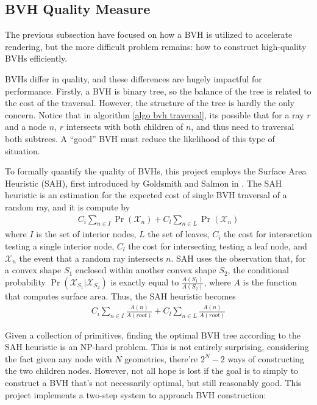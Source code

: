 \subsection{BVH Quality Measure}
The previous subsection have focused on how a BVH is utilized to accelerate rendering, but the more difficult problem remains: how to construct high-quality BVHs efficiently. 

BVHs differ in quality, and these differences are hugely impactful for performance. Firstly, a BVH is binary tree, so the balance of the tree is related to the cost of the traversal. However, the structure of the tree is hardly the only concern. Notice that in algorithm \ref{algo bvh traversal}, its possible that for a ray $r$ and a node $n$, $r$ intersects with both children of $n$, and thus need to traversal both subtrees. A ``good'' BVH must reduce the likelihood of this type of situation. 

To formally quantify the quality of BVHs, this project employs the Surface Area Heuristic (SAH), first introduced by Goldsmith and Salmon in \cite{goldsmith1987automatic}. The SAH heuristic is an estimation for the expected cost of single BVH traversal of a random ray, and it is compute by
\begin{align*}
    C_i \sum_{n\in I} \Pr(\mathcal{X}_n) + C_l \sum_{n\in L} \Pr(\mathcal{X}_n)
\end{align*}
where $I$ is the set of interior nodes, $L$ the set of leaves, $C_i$ the cost for intersection testing a single interior node, $C_l$ the cost for intersecting testing a leaf node, and $\mathcal{X}_n$ the event that a random ray intersects $n$. SAH uses the observation that, for a convex shape $S_1$ enclosed within another convex shape $S_2$, the conditional probability $\Pr(\mathcal{X}_{S_1} | \mathcal{X}_{S_2})$ is exactly equal to $\frac{A(S_1)}{A(S_2)}$, where $A$ is the function that computes surface area\cite{goldsmith1987automatic}. Thus, the SAH heuristic becomes
\begin{align*}
    C_i \sum_{n\in I} \frac{A(n)}{A(root)} + C_l \sum_{n\in L} \frac{A(n)}{A(root)}
\end{align*}

Given a collection of primitives, finding the optimal BVH tree according to the SAH heuristic is an NP-hard problem\cite{bvh_optimize}. This is not entirely surprising, considering the fact given any node with $N$ geometries, there're $2^N-2$ ways of constructing the two children nodes. However, not all hope is lost if the goal is to simply to construct a BVH that's not necessarily optimal, but still reasonably good. This project implements a two-step system to approach BVH construction:

